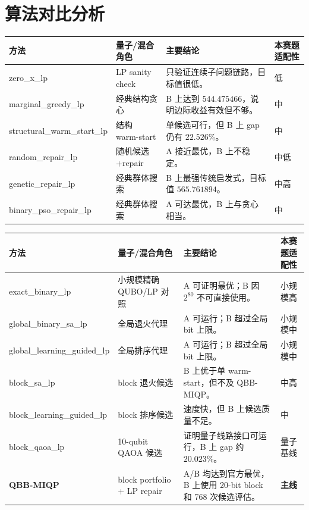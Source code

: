 \documentclass[UTF8,a4paper,11pt]{ctexart}
\begin{document}
\section{算法对比分析}

{\scriptsize
\begin{center}
\setlength{\tabcolsep}{3pt}
\begin{tabular}{p{3.9cm}p{3.1cm}p{4.6cm}p{2.8cm}}
\toprule
方法 & 量子/混合角色 & 主要结论 & 本赛题适配性 \\
\midrule
zero\_x\_lp & LP sanity check & 只验证连续子问题链路，目标值很低。 & 低 \\
marginal\_greedy\_lp & 经典结构贪心 & B 上达到 $544.475466$，说明边际收益有效但不够。 & 中 \\
structural\_warm\_start\_lp & 结构 warm-start & 单候选可行，但 B 上 gap 仍有 $22.526\%$。 & 中 \\
random\_repair\_lp & 随机候选+repair & A 接近最优，B 上不稳定。 & 中低 \\
genetic\_repair\_lp & 经典群体搜索 & B 上最强传统启发式，目标值 $565.761894$。 & 中高 \\
binary\_pso\_repair\_lp & 经典群体搜索 & A 可达最优，B 上与贪心相当。 & 中 \\
\bottomrule
\end{tabular}
\end{center}

\begin{center}
\setlength{\tabcolsep}{3pt}
\begin{tabular}{p{3.9cm}p{3.1cm}p{4.6cm}p{2.8cm}}
\toprule
方法 & 量子/混合角色 & 主要结论 & 本赛题适配性 \\
\midrule
exact\_binary\_lp & 小规模精确 QUBO/LP 对照 & A 可证明最优；B 因 $2^{80}$ 不可直接使用。 & 小规模高 \\
global\_binary\_sa\_lp & 全局退火代理 & A 可运行；B 超过全局 bit 上限。 & 小规模中 \\
global\_learning\_guided\_lp & 全局排序代理 & A 可运行；B 超过全局 bit 上限。 & 小规模中 \\
block\_sa\_lp & block 退火候选 & B 上优于单 warm-start，但不及 QBB-MIQP。 & 中高 \\
block\_learning\_guided\_lp & block 排序候选 & 速度快，但 B 上候选质量不足。 & 中 \\
block\_qaoa\_lp & 10-qubit QAOA 候选 & 证明量子线路接口可运行，B 上 gap 约 $20.023\%$。 & 量子基线 \\
\textbf{QBB-MIQP} & block portfolio + LP repair & A/B 均达到官方最优，B 上使用 20-bit block 和 768 次候选评估。 & \textbf{主线} \\
\bottomrule
\end{tabular}
\end{center}
}
\end{document}
